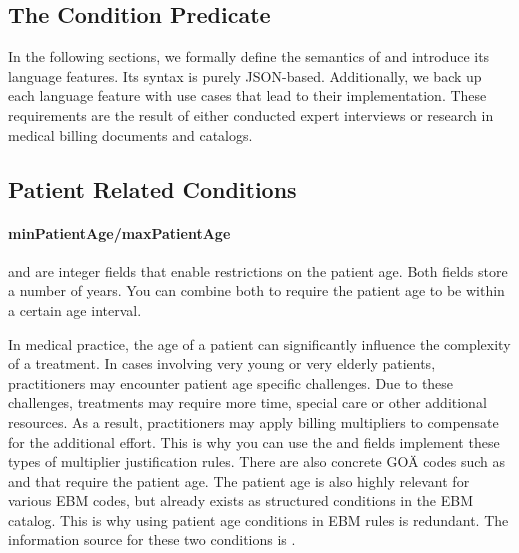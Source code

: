 \subsection{The Condition Predicate}\label{subsec:the-condition-predicate}

In the following sections, we formally define the semantics of \RL and introduce its language features.
Its syntax is purely JSON-based.
Additionally, we back up each language feature with use cases that lead to their implementation.
These requirements are the result of either conducted expert interviews or research in medical billing documents and catalogs.




\subsection{Patient Related Conditions}\label{subsec:patient-related-conditions}

\paragraph{minPatientAge/maxPatientAge}
 and  are integer fields that enable restrictions on the patient age.
Both fields store a number of years.
You can combine both to require the patient age to be within a certain age interval.

In medical practice, the age of a patient can significantly influence the complexity of a treatment.
In cases involving very young or very elderly patients, practitioners may encounter patient age specific challenges.
Due to these challenges, treatments may require more time, special care or other additional resources.
As a result, practitioners may apply billing multipliers to compensate for the additional effort.
This is why you can use the  and  fields implement these types of multiplier justification rules.
There are also concrete GOÄ codes such as  and  that require the patient age.
The patient age is also highly relevant for various EBM codes, but already exists as structured conditions in the EBM catalog.
This is why using patient age conditions in EBM rules is redundant.
The information source for these two conditions is .

